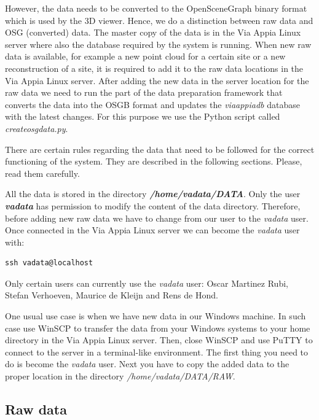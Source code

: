 \documentclass[a4paper,11pt]{article}
\begin{document}
However, the data needs to be converted to the OpenSceneGraph binary format which is used by the 3D viewer. Hence, we do a distinction between raw data and OSG (converted) data. The master copy of the data is in the Via Appia Linux server where also the database required by the system is running. When new raw data is available, for example a new point cloud for a certain site or a new reconstruction of a site, it is required to add it to the raw data locations in the Via Appia Linux server. After adding the new data in the server location for the raw data we need to run the part of the data preparation framework that converts the data into the OSGB format and updates the \textit{viaappiadb} database with the latest changes. For this purpose we use the Python script called \textit{createosgdata.py}.

There are certain rules regarding the data that need to be followed for the correct functioning of the system. They are described in the following sections. Please, read them carefully.

All the data is stored in the directory \textbf{\textit{/home/vadata/DATA}}. Only the user \textbf{\textit{vadata}} has permission to modify the content of the data directory. Therefore, before adding new raw data we have to change from our user to the \textit{vadata} user. Once connected in the Via Appia Linux server we can become the \textit{vadata} user with:

\begin{Verbatim}[fontfamily=courier,commandchars=\\\{\},fontsize=\footnotesize]
ssh vadata@localhost
\end{Verbatim}

Only certain users can currently use the \textit{vadata} user: Oscar Martinez Rubi, Stefan Verhoeven, Maurice de Kleijn and Rens de Hond.

One usual use case is when we have new data in our Windows machine. In such case use WinSCP to transfer the data from your Windows systems to your home directory in the Via Appia Linux server. Then, close WinSCP and use PuTTY to connect to the server in a terminal-like environment. The first thing you need to do is become the \textit{vadata} user. Next you have to copy the added data to the proper location in the directory \textit{/home/vadata/DATA/RAW}.

\subsection{Raw data}
\end{document}
